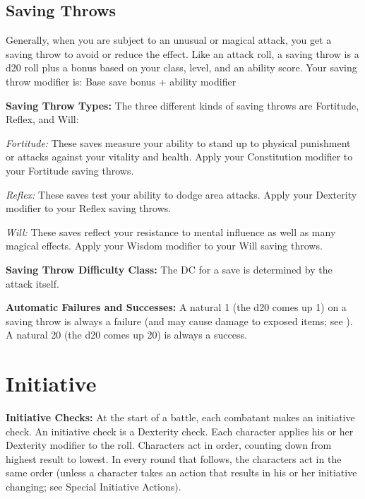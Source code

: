 \subsection{Saving Throws}

Generally, when you are subject to an unusual or magical attack, you get a saving throw to avoid or reduce the effect. Like an attack roll, a saving throw is a d20 roll plus a bonus based on your class, level, and an ability score. Your saving throw modifier is: Base save bonus + ability modifier 

\textbf{Saving Throw Types:} The three different kinds of saving throws are Fortitude, Reflex, and Will:

\textit{Fortitude:} These saves measure your ability to stand up to physical punishment or attacks against your vitality and health. Apply your Constitution modifier to your Fortitude saving throws. 

\textit{Reflex:} These saves test your ability to dodge area attacks. Apply your Dexterity modifier to your Reflex saving throws. 

\textit{Will:} These saves reflect your resistance to mental influence as well as many magical effects. Apply your Wisdom modifier to your Will saving throws.

\textbf{Saving Throw Difficulty Class:} The DC for a save is determined by the attack itself.

\textbf{Automatic Failures and Successes:} A natural 1 (the d20 comes up 1) on a saving throw is always a failure (and may cause damage to exposed items; see
). A natural 20 (the d20 comes up 20) is always a success.

\section{Initiative}

\textbf{Initiative Checks:} At the start of a battle, each combatant makes an initiative check. An initiative check is a Dexterity check. Each character applies his or her Dexterity modifier to the roll. Characters act in order, counting down from highest result to lowest. In every round that follows, the characters act in the same order (unless a character takes an action that results in his or her initiative changing; see Special Initiative Actions).

